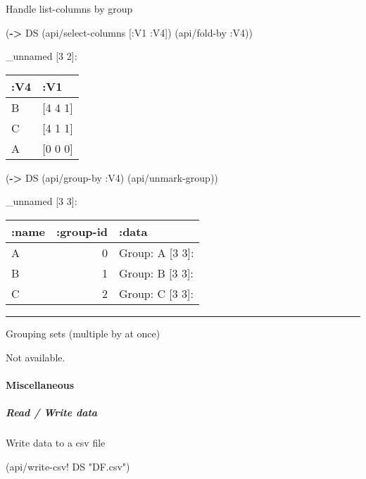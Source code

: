 \documentclass[]{article}
\newenvironment{Shaded}{\begin{snugshade}}{\end{snugshade}}
\newcommand{\KeywordTok}[1]{\textcolor[rgb]{0.13,0.29,0.53}{\textbf{#1}}}
\newcommand{\StringTok}[1]{\textcolor[rgb]{0.31,0.60,0.02}{#1}}
\newcommand{\AttributeTok}[1]{\textcolor[rgb]{0.77,0.63,0.00}{#1}}
\newcommand{\NormalTok}[1]{#1}
\let\oldparagraph\paragraph
\renewcommand{\paragraph}[1]{\oldparagraph{#1}\mbox{}}
\let\oldsubparagraph\subparagraph
\renewcommand{\subparagraph}[1]{\oldsubparagraph{#1}\mbox{}}
\begin{document}
Handle list-columns by group

\begin{Shaded}
\begin{Highlighting}[]
\NormalTok{(}\KeywordTok{->}\NormalTok{ DS}
\NormalTok{    (api/select-columns [}\AttributeTok{:V1} \AttributeTok{:V4}\NormalTok{])}
\NormalTok{    (api/fold-by }\AttributeTok{:V4}\NormalTok{))}
\end{Highlighting}
\end{Shaded}

\_unnamed {[}3 2{]}:

\begin{longtable}[]{@{}ll@{}}
\toprule
:V4 & :V1\tabularnewline
\midrule
\endhead
B & {[}4 4 1{]}\tabularnewline
C & {[}4 1 1{]}\tabularnewline
A & {[}0 0 0{]}\tabularnewline
\bottomrule
\end{longtable}

\begin{Shaded}
\begin{Highlighting}[]
\NormalTok{(}\KeywordTok{->}\NormalTok{ DS    }
\NormalTok{    (api/group-by }\AttributeTok{:V4}\NormalTok{)}
\NormalTok{    (api/unmark-group))}
\end{Highlighting}
\end{Shaded}

\_unnamed {[}3 3{]}:

\begin{longtable}[]{@{}lrl@{}}
\toprule
:name & :group-id & :data\tabularnewline
\midrule
\endhead
A & 0 & Group: A {[}3 3{]}:\tabularnewline
B & 1 & Group: B {[}3 3{]}:\tabularnewline
C & 2 & Group: C {[}3 3{]}:\tabularnewline
\bottomrule
\end{longtable}

\begin{center}\rule{0.5\linewidth}{0.5pt}\end{center}

Grouping sets (multiple by at once)

Not available.

\paragraph{Miscellaneous}\label{miscellaneous}

\subparagraph{Read / Write data}\label{read-write-data}

Write data to a csv file

\begin{Shaded}
\begin{Highlighting}[]
\NormalTok{(api/write-csv! DS }\StringTok{"DF.csv"}\NormalTok{)}
\end{Highlighting}
\end{Shaded}
\end{document}
